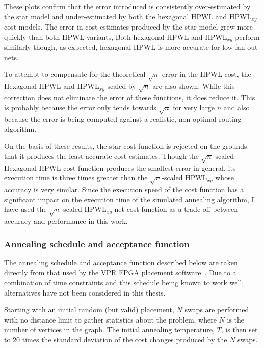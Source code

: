 				These plots confirm that the error introduced is consistently
				over-estimated by the star model and under-estimated by both the
				hexagonal HPWL and HPWL${_{xy}}$ cost models. The error in cost
				estimates produced by the star model grew more quickly than both HPWL
				variants, Both hexagonal HPWL and HPWL$_{xy}$ perform similarly though,
				as expected, hexagonal HPWL is more accurate for low fan out nets.
				
				To attempt to compensate for the theoretical $\sqrt{n}$ error in the
				HPWL cost, the Hexagonal HPWL and HPWL$_{xy}$ scaled by $\sqrt{n}$ are
				also shown. While this correction does not eliminate the error of these
				functions, it does reduce it. This is probably because the error only
				tends towards $\sqrt{n}$ for very large $n$ \cite{chung79} and also
				because the error is being computed against a realistic, non optimal
				routing algorithm.
				
				On the basis of these results, the star cost function is rejected on
				the grounds that it produces the least accurate cost estimates. Though
				the $\sqrt{n}$-scaled Hexagonal HPWL cost function produces the
				smallest error in general, its execution time is three times greater
				than the $\sqrt{n}$-scaled HPWL$_{xy}$ whose accuracy is very similar.
				Since the execution speed of the cost function has a significant impact
				on the execution time of the simulated annealing algorithm, I have used
				the $\sqrt{n}$-scaled HPWL$_{xy}$ net cost function as a trade-off
				between accuracy and performance in this work.
				
			\subsubsection{Annealing schedule and acceptance function}
				
				\label{sec:placement-schedule-acceptance}
				
				The annealing schedule and acceptance function described below are
				taken directly from that used by the VPR FPGA placement
				software~\cite{betz97}. Due to a combination of time constraints and
				this schedule being known to work well, alternatives have not been
				considered in this thesis.
				
				Starting with an initial random (but valid) placement, $N$ swaps
				are performed with no distance limit to gather statistics about the
				problem, where $N$ is the number of vertices in the graph. The initial
				annealing temperature, $T$, is then set to 20 times the standard
				deviation of the cost changes produced by the $N$ swaps.
				
